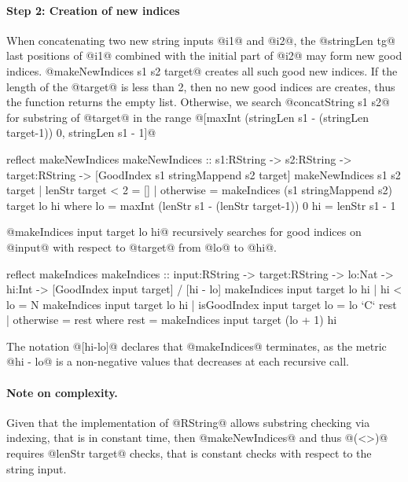 \paragraph{Step 2: Creation of new indices}
When concatenating two new string inputs @i1@ and @i2@,
the @stringLen tg@ last positions of @i1@ combined with the initial part of @i2@
may form new good indices.
%
@makeNewIndices s1 s2 target@ creates all such good new indices.
%
If the length of the @target@ is less than 2, then no new good indices are creates,
thus the function returns the empty list.
Otherwise, we search @concatString s1 s2@ for substring of @target@
in the range @[maxInt (stringLen s1 - (stringLen target-1)) 0, stringLen s1 - 1]@
\begin{code}
reflect makeNewIndices
makeNewIndices
  :: s1:RString -> s2:RString -> target:RString
  -> [GoodIndex {s1 stringMappend s2} target]
makeNewIndices s1 s2 target
  | lenStr target < 2
  = []
  | otherwise
  = makeIndices (s1 stringMappend s2) target lo hi
  where
    lo = maxInt (lenStr s1 - (lenStr target-1)) 0
    hi = lenStr s1 - 1
\end{code}
%
@makeIndices input target lo hi@
recursively searches for good indices on @input@ with respect to @target@
from @lo@ to @hi@.
%
\begin{code}
reflect makeIndices
makeIndices
  :: input:RString -> target:RString -> lo:Nat
  -> hi:Int -> [GoodIndex input target]
  / [hi - lo]
makeIndices input target lo hi
  | hi < lo
  = N
makeIndices input target lo hi
  | isGoodIndex input target lo
  = lo `C` rest
  | otherwise
  = rest
  where
    rest = makeIndices input target (lo + 1) hi
\end{code}
%
The notation @[hi-lo]@ declares that @makeIndices@ terminates, as the metric @hi - lo@
is a non-negative values that decreases at each recursive call.

\paragraph{Note on complexity.}
Given that the implementation of @RString@
allows substring checking via indexing, that is in constant time,
then @makeNewIndices@ and thus @(<>)@ requires @lenStr target@ checks,
that is constant checks with respect to the string input.

